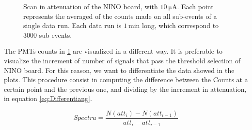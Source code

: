 \begin{figure}[hbtp]
\centering
{}
\caption{Scan in attenuation of the NINO board, with $\SI{10}{\micro \ampere}$. Each point represents the averaged of the counts made on all sub-events of a single data run. Each data run is $\SI{1}{\minute}$ long, which correspond to $3000$ sub-events.}\label{fig:AttScan}
\end{figure}

The PMTs counts in \ref{fig:AttScan} are visualized in a different way. It is preferable to visualize the increment of number of signals that pass the threshold selection of NINO board. For this reason, we want to differentiate the data showed in the plots. This procedure consist in computing the difference between the Counts at a certain point and the previous one, and dividing by the increment in attenuation, in equation \ref{eq:Differentiang}.

\begin{equation} \label{eq:Differentiang}
Spectra = \frac{N(att_{i}) - N(att_{i-1})}{att_{i} - att_{i-1}} 
\end{equation}

